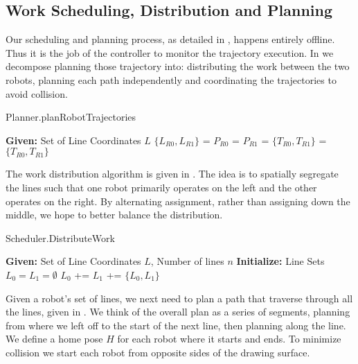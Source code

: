 
\subsection{Work Scheduling, Distribution and Planning}
\label{sec:software_sdp}

Our scheduling and planning process, as detailed in , happens entirely offline. Thus it is the job of the controller to monitor the trajectory execution. In  we decompose planning those trajectory into: distributing the work between the two robots, planning each path independently and coordinating the trajectories to avoid collision. 

\begin{algorithm}[ht!]
\caption{Planner.planRobotTrajectories}
\label{algo:sdp_overview}
\begin{algorithmic}[1]  
\State \textbf{Given:} Set of Line Coordinates $L$ 
\State $\{L_{R0}, L_{R1}\}$ = 
\State $P_{R0}$ = 
\State $P_{R1}$ = 
\State $\{T_{R0}, T_{R1}\}$ = 
\State \Return $\{T_{R0}, T_{R1}\}$
\end{algorithmic}
\end{algorithm}

The work distribution algorithm is given in . The idea is to spatially segregate the lines such that one robot primarily operates on the left and the other operates on the right. By alternating assignment, rather than assigning down the middle, we hope to better balance the distribution.  

\begin{algorithm}[ht!]
\caption{Scheduler.DistributeWork}
\label{algo:distribute}
\begin{algorithmic}[1]  
\State \textbf{Given:} Set of Line Coordinates $L$, Number of lines $n$
\State \textbf{Initialize:} Line Sets $L_{0} = L_{1} = \emptyset$
\State $L_{0}$ += 
\State $L_{1}$ += 
\EndProcedure
\State \Return $\{L_{0}, L_{1}\}$
\end{algorithmic}
\end{algorithm}

Given a robot's set of lines, we next need to plan a path that traverse through all the lines, given in . We think of the overall plan as a series of segments, planning from where we left off to the start of the next line, then planning along the line. We define a home pose $H$ for each robot where it starts and ends. To minimize collision we start each robot from opposite sides of the drawing surface.  

